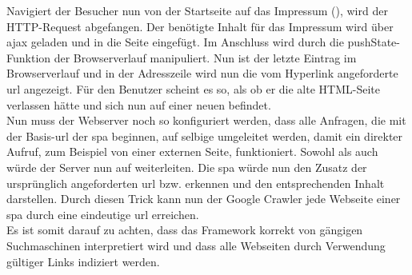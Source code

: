 Navigiert der Besucher nun von der Startseite auf das Impressum (), wird der HTTP-Request abgefangen. Der benötigte Inhalt für das Impressum wird über \ac{ajax} geladen und in die Seite eingefügt. Im Anschluss wird durch die pushState-Funktion der Browserverlauf manipuliert. Nun ist der letzte Eintrag im Browserverlauf  und in der Adresszeile wird nun die vom Hyperlink angeforderte \ac{url} angezeigt. Für den Benutzer scheint es so, als ob er die alte HTML-Seite verlassen hätte und sich nun auf einer neuen befindet.\\
Nun muss der Webserver noch so konfiguriert werden, dass alle Anfragen, die mit der Basis-\ac{url} der \ac{spa} beginnen, auf selbige umgeleitet werden, damit ein direkter Aufruf, zum Beispiel von einer externen Seite, funktioniert. Sowohl  als auch  würde der Server nun auf  weiterleiten. Die \ac{spa} würde nun den Zusatz der ursprünglich angeforderten \ac{url}  bzw.  erkennen und den entsprechenden Inhalt darstellen. Durch diesen Trick kann nun der Google Crawler jede Webseite einer \ac{spa} durch eine eindeutige \ac{url} erreichen. \\
Es ist somit darauf zu achten, dass das Framework korrekt von gängigen Suchmaschinen interpretiert wird und dass alle Webseiten durch Verwendung gültiger Links indiziert werden.
